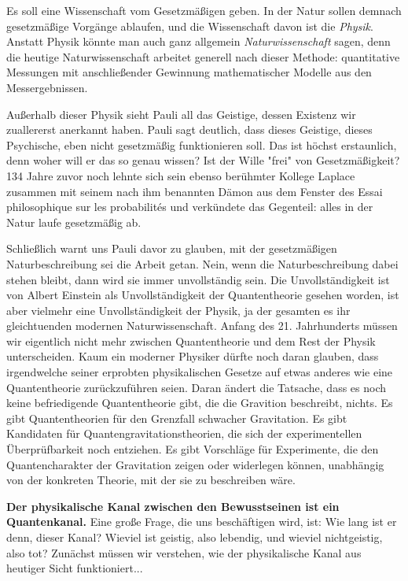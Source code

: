 \documentclass[12pt]{book}
\begin{document}
Es soll eine Wissenschaft vom Gesetzmäßigen geben. In der Natur sollen demnach gesetzmäßige Vorgänge ablaufen, und die Wissenschaft davon ist die \emph{Physik}. Anstatt Physik könnte man auch ganz allgemein \emph{Naturwissenschaft} sagen, denn die heutige Naturwissenschaft arbeitet generell nach dieser Methode: quantitative Messungen mit anschließender Gewinnung mathematischer Modelle aus den Messergebnissen.

Außerhalb dieser Physik sieht Pauli all das Geistige, dessen Existenz wir zuallererst anerkannt haben. Pauli sagt deutlich, dass dieses Geistige, dieses Psychische, eben nicht gesetzmäßig funktionieren soll. Das ist höchst erstaunlich, denn woher will er das so genau wissen? Ist der Wille "frei" von Gesetzmäßigkeit? 134 Jahre zuvor noch lehnte sich sein ebenso berühmter Kollege Laplace zusammen mit seinem nach ihm benannten Dämon aus dem Fenster des Essai philosophique sur les probabilités und verkündete das Gegenteil: alles in der Natur laufe gesetzmäßig ab.

Schließlich warnt uns Pauli davor zu glauben, mit der gesetzmäßigen Naturbeschreibung sei die Arbeit getan. Nein, wenn die Naturbeschreibung dabei stehen bleibt, dann wird sie immer unvollständig sein. Die Unvollständigkeit ist von Albert Einstein als Unvollständigkeit der Quantentheorie gesehen worden, ist aber vielmehr eine Unvollständigkeit der Physik, ja der gesamten es ihr gleichtuenden modernen Naturwissenschaft. Anfang des 21. Jahrhunderts müssen wir eigentlich nicht mehr zwischen Quantentheorie und dem Rest der Physik unterscheiden. Kaum ein moderner Physiker dürfte noch daran glauben, dass irgendwelche seiner erprobten physikalischen Gesetze auf etwas anderes wie eine Quantentheorie zurückzuführen seien. Daran ändert die Tatsache, dass es noch keine befriedigende Quantentheorie gibt, die die Gravition beschreibt, nichts. Es gibt Quantentheorien für den Grenzfall schwacher Gravitation. Es gibt Kandidaten für Quantengravitationstheorien, die sich der experimentellen Überprüfbarkeit noch entziehen. Es gibt Vorschläge für Experimente, die den Quantencharakter der Gravitation zeigen oder widerlegen können, unabhängig von der konkreten Theorie, mit der sie zu beschreiben wäre. 

\textbf{Der physikalische Kanal zwischen den Bewusstseinen ist ein Quantenkanal.} Eine große Frage, die uns beschäftigen wird, ist: Wie lang ist er denn, dieser Kanal? Wieviel ist geistig, also lebendig, und wieviel nichtgeistig, also tot? Zunächst müssen wir verstehen, wie der physikalische Kanal aus heutiger Sicht funktioniert...
\end{document}
